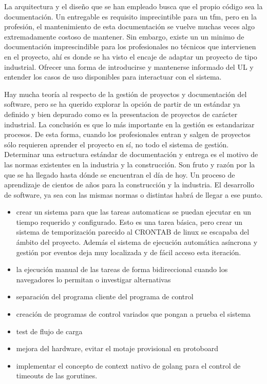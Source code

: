 La arquitectura y el diseño que se han empleado busca que el propio código sea la documentación. Un entregable es requisito imprecintible para un tfm, pero en la profesión, el mantenimiento de esta documentación se vuelve muchas veces algo extremadamente costoso de mantener. Sin embargo, existe un un minimo de documentación imprescindible para los profesionales no técnicos que intervienen en el proyecto, ahí es donde se ha visto el encaje de adaptar un proyecto de tipo industrial. Ofrecer una forma de introducirse y mantenerse informado del UL y entender los casos de uso disponibles para interactuar con el sistema.

Hay mucha teoría al respecto de la gestión de proyectos y documentación del software, pero se ha querido explorar la opción de partir de un estándar ya definido y bien depurado como es la presentacion de proyectos de carácter industrial. La conclusión es que lo más importante en la gestión es estandarizar procesos. De esta forma, cuando los profesionales entran y salgen de proyectos sólo requieren aprender el proyecto en sí, no todo el sistema de gestión. Determinar una estructura estándar de documentación y entrega es el motivo de las normas existentes en la industria y la construcción. Son fruto y razón por la que se ha llegado hasta dónde se encuentran el día de hoy. Un proceso de aprendizaje de cientos de años para la construcción y la industria. El desarrollo de software, ya sea con las mismas normas o distintas habrá de llegar a ese punto.


\begin{itemize}
    \item crear un sistema para que las tareas automaticas se puedan ejecutar en un tiempo requerido y configurado. Esto es una tarea básica, pero crear un sistema de temporización parecido al CRONTAB de linux se escapaba del ámbito del proyecto. Además el sistema de ejecución automática asíncrona y gestión por eventos deja muy localizada y de fácil acceso esta iteración.
    \item la ejecución manual de las tareas de forma bidireccional cuando los navegadores lo permitan o investigar alternativas
    \item separación del programa cliente del programa de control
    \item creación de programas de control variados que pongan a prueba el sistema
    \item test de flujo de carga
    \item mejora del hardware, evitar el motaje provisional en protoboard
    \item implementar el concepto de context nativo de golang para el control de timeouts de las gorutines.
\end{itemize}
